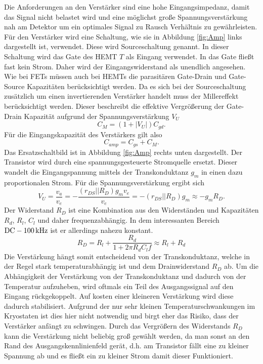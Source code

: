 Die Anforderungen an den Verstärker sind eine hohe Eingangsimpedanz, damit das Signal nicht belastet wird und eine möglichst große Spannungsverstärkung nah am Detektor um ein optimales Signal zu Rausch Verhältnis zu gewährleisten.
Für den Verstärker wird eine Schaltung, wie sie in Abbildung \ref{fig:Amp} links dargestellt ist, verwendet.
Diese wird Sourceschaltung\cite{Tietze2002} genannt.
In dieser Schaltung wird das Gate des HEMT $T$ als Eingang verwendet.
In das Gate fließt fast kein Strom.
Daher wird der Eingangswiderstand als unendlich angesehen.
Wie bei FETs müssen auch bei HEMTs die parasitären Gate-Drain und Gate-Source Kapazitäten berücksichtigt werden.
Da es sich bei der Sourceschaltung zusätzlich um einen invertierenden Verstärker handelt muss der Millereffekt berücksichtigt werden.
Dieser beschreibt die effektive Vergrößerung der Gate-Drain Kapazität aufgrund der Spannungsverstärkung $V_U$
\begin{equation}
C_M = (1+ |V_U|)C_{gd}.
\end{equation}
Für die Eingangskapazität des Verstärkers gilt also 
\begin{equation}
C_{amp} = C_{gs} + C_M.
\label{eq:Camp}
\end{equation}
Das Ersatzschaltbild ist in Abbildung \ref{fig:Amp} rechts unten dargestellt.
Der Transistor wird durch eine spannungsgesteuerte Stromquelle ersetzt.
Dieser wandelt die Eingangspannung mittels der Transkonduktanz $g_m$ in einen dazu proportionalen Strom.
Für die Spannungsverstärkung ergibt sich
\begin{equation}
V_U = \frac{v_a}{v_e} = -\frac{(r_{DS}||R_D)g_mv_e}{v_e} = -(r_{DS}||R_D)g_m \approx
-g_m R_D.
\label{eq:amp}
\end{equation}
Der Widerstand $R_D$ ist eine Kombination aus den Widerständen und Kapazitäten $R_d$, $R_l$, $C_l$ und daher frequenzabhängig.
In dem interessanten Bereich $\text{DC} \-- \SI{100}{\kilo\hertz}$ ist er allerdings nahezu konstant.
\begin{equation}
R_D = R_l + \frac{R_d}{1 + 2\pi R_d C_l f} \approx R_l + R_d
\end{equation}
Die Verstärkung hängt somit entscheidend von der Transkonduktanz, welche in der Regel stark temperaturabhängig ist und dem Drainwiderstand $R_D$ ab.
Um die Abhängigkeit der Verstärkung von der Transkonduktanz und dadurch von der Temperatur aufzuheben, wird oftmals ein Teil des Ausgangssignal auf den Eingang rückgekoppelt.
Auf kosten einer kleineren Verstärkung wird diese dadurch stabilisiert.
Aufgrund der nur sehr kleinen Temperaturschwankungen im Kryostaten ist dies hier nicht notwendig und birgt eher das Risiko, dass der Verstärker anfängt zu schwingen.
Durch das Vergrößern des Widerstands $R_D$ kann die Verstärkung nicht beliebig groß gewählt werden, da man sonst an den Rand des Ausgangskennlinienfeld gerät, d.h. am Transistor fällt eine zu kleiner Spannung ab und es fließt ein zu kleiner Strom damit dieser Funktioniert.

